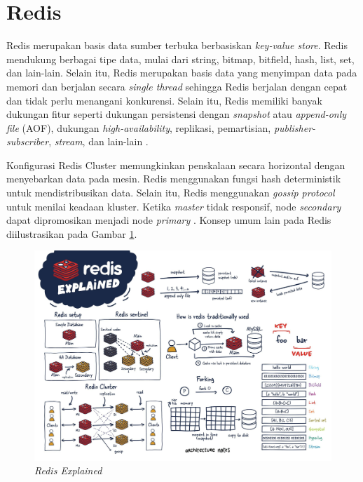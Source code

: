 \section{Redis}

Redis merupakan basis data sumber terbuka berbasiskan \textit{key-value store}. Redis mendukung berbagai tipe data, mulai dari string, bitmap, bitfield, hash, list, set, dan lain-lain. Selain itu, Redis merupakan basis data yang menyimpan data pada memori dan berjalan secara \textit{single thread} sehingga Redis berjalan dengan cepat dan tidak perlu menangani konkurensi. Selain itu, Redis memiliki banyak dukungan fitur seperti dukungan persistensi dengan \textit{snapshot} atau \textit{append-only file} (AOF), dukungan \textit{high-availability}, replikasi, pemartisian, \textit{publisher-subscriber}, \textit{stream}, dan lain-lain \parencite{redisExplained}.

Konfigurasi Redis Cluster memungkinkan penskalaan secara horizontal dengan menyebarkan data pada mesin. Redis menggunakan fungsi hash deterministik untuk mendistribusikan data. Selain itu, Redis menggunakan \textit{gossip protocol} untuk menilai keadaan kluster. Ketika \textit{master} tidak responsif, node \textit{secondary} dapat dipromosikan menjadi node \textit{primary} \parencite{redisExplained}. Konsep umum lain pada Redis diilustrasikan pada Gambar \ref{fig:redis-explained}.

\begin{figure}[htbp]
    \centering
    \includegraphics[width=1\textwidth]{resources/chapter-2/redis.jpg}
    \caption{\textit{Redis Explained \parencite{redisExplained}}}
    \label{fig:redis-explained}
\end{figure}

